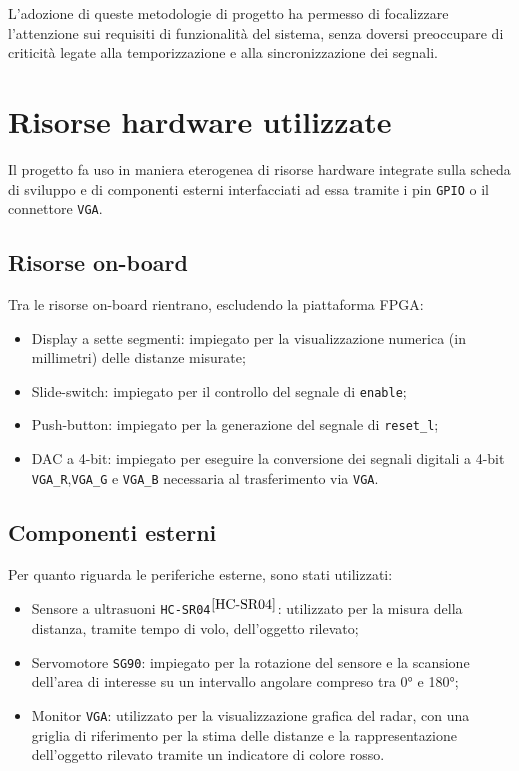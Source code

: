 \documentclass[reprint,amsmath,amssymb,aps,rmp,twoside]{revtex4-2}
\begin{document}
L'adozione di queste metodologie di progetto ha permesso di focalizzare l'attenzione sui requisiti di funzionalità del sistema, senza doversi preoccupare di criticità legate alla temporizzazione e alla sincronizzazione dei segnali.




\section{Risorse hardware utilizzate}


Il progetto fa uso in maniera eterogenea di risorse hardware integrate sulla scheda di sviluppo e di componenti esterni interfacciati ad essa tramite i pin \texttt{GPIO} o il connettore \texttt{VGA}.


\subsection{Risorse on-board}

Tra le risorse on-board rientrano, escludendo la piattaforma FPGA:

\begin{itemize}
    \item Display a sette segmenti: impiegato per la visualizzazione numerica (in millimetri) delle distanze misurate;
    \item Slide-switch: impiegato per il controllo del segnale di \texttt{enable};
    \item Push-button: impiegato per la generazione del segnale di \texttt{reset_l};
    \item DAC a 4-bit: impiegato per eseguire la conversione dei segnali digitali a 4-bit \texttt{VGA\_R},\texttt{VGA\_G} e \texttt{VGA\_B} necessaria al trasferimento via \texttt{VGA}.
\end{itemize}

\subsection{Componenti esterni}

Per quanto riguarda le periferiche esterne, sono stati utilizzati:

\begin{itemize}
    \item Sensore a ultrasuoni \texttt{HC-SR04}$^{\cite{HC-SR04}}$: utilizzato per la misura della distanza, tramite tempo di volo, dell'oggetto rilevato;
    \item Servomotore \texttt{SG90}: impiegato per la rotazione del sensore e la scansione dell'area di interesse su un intervallo angolare compreso tra 0° e 180°;
    \item Monitor \texttt{VGA}: utilizzato per la visualizzazione grafica del radar, con una griglia di riferimento per la stima delle distanze e la rappresentazione dell'oggetto rilevato tramite un indicatore di colore rosso.
\end{itemize}
\end{document}
